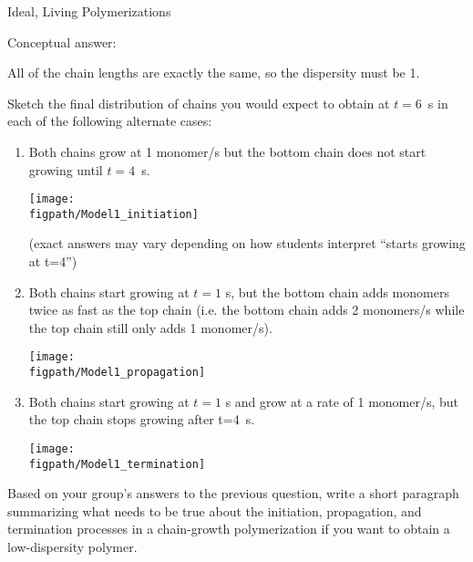 \begin{activity}{Ideal, Living Polymerizations}
\begin{ctqs}
\begin{solution}[1.25in]{}
					Conceptual answer:
					
						All of the chain lengths are exactly the same, so the dispersity must be 1.
						
				\end{solution}

	\question Sketch the final distribution of chains you would expect to obtain at $t=6$~s in each of the following alternate cases:

		\begin{enumerate}

			\item Both chains grow at 1 monomer/s but the bottom chain does not start growing until $t=4$~s.
			
				\begin{solution}[0.75in]{}
					\centerline{\texttt{[image: \\figpath/Model1\_initiation]}}(exact answers may vary depending on how students interpret ``starts growing at t=4'')
				
				\end{solution}

			\item Both chains start growing at $t=1$ s, but the bottom chain adds monomers twice as fast as the top chain (i.e. the bottom chain adds 2 monomers/s while the top chain still only adds 1 monomer/s).
			
				\begin{solution}[0.75in]{}
					\texttt{[image: \\figpath/Model1\_propagation]}
				
				\end{solution}

			\item Both chains start growing at $t=1$ s and grow at a rate of 1 monomer/s, but the top chain stops growing after t=4~s.
			
				\begin{solution}[0.75in]{}
					\texttt{[image: \\figpath/Model1\_termination]} 
				
				\end{solution}
				
		\end{enumerate}
		
	\question Based on your group's answers to the previous question, write a short paragraph summarizing what needs to be true about the initiation, propagation, and termination processes in a chain-growth polymerization if you want to obtain a low-dispersity polymer.
	

\end{ctqs}
\end{activity}
